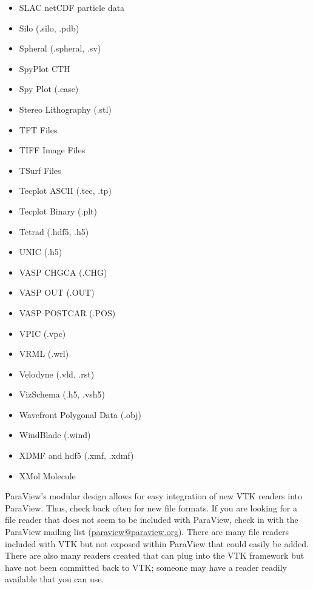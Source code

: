 \begin{itemize}
  \item SLAC netCDF particle data
  \item Silo (.silo, .pdb)
  \item Spheral (.spheral, .sv)
  \item SpyPlot CTH
  \item Spy Plot (.case)
  \item Stereo Lithography (.stl)
  \item TFT Files
  \item TIFF Image Files
  \item TSurf Files
  \item Tecplot ASCII (.tec, .tp)
  \item Tecplot Binary (.plt)
  \item Tetrad (.hdf5, .h5)
  \item UNIC (.h5) 
  \item VASP CHGCA (.CHG)
  \item VASP OUT (.OUT) 
  \item VASP POSTCAR (.POS) 
  \item VPIC (.vpc)
  \item VRML (.wrl)
  \item Velodyne (.vld, .rst)
  \item VizSchema (.h5, .vsh5)
  \item Wavefront Polygonal Data (.obj)
  \item WindBlade (.wind)
  \item XDMF and hdf5 (.xmf, .xdmf)
  \item XMol Molecule
  \end{itemize}


ParaView's modular design allows for easy integration of new VTK readers
into ParaView.  Thus, check back often for new file formats.  If you are
looking for a file reader that does not seem to be included with ParaView,
check in with the ParaView mailing list
(\href{mailto:paraview@paraview.org}{paraview@paraview.org}).  There are
many file readers included with VTK but not exposed within ParaView that
could easily be added.  There are also many readers created that can plug
into the VTK framework but have not been committed back to VTK; someone may
have a reader readily available that you can use.

